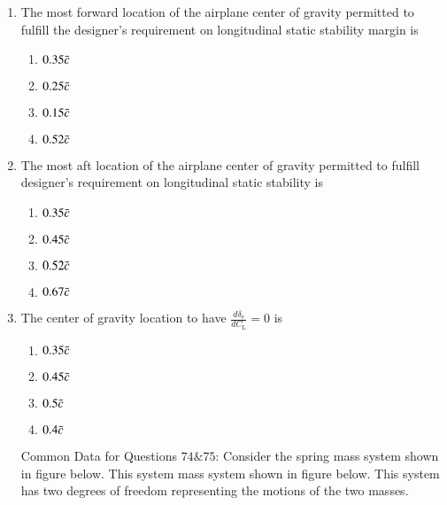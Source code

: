 \documentclass[journal]{IEEEtran}
\begin{document}
\begin{enumerate}
\item  The most forward location of the airplane  center of gravity permitted to fulfill the designer's requirement on longitudinal static stability margin is
\begin{enumerate}
    \item $0.35 \Bar{c}$
    \item $0.25 \Bar{c}$
    \item $0.15 \Bar{c}$
    \item $0.52 \Bar{c}$\\
\end{enumerate}
\item The most aft location of the airplane center of gravity permitted to fulfill designer's requirement on longitudinal static stability is
\begin{enumerate}
    \item $0.35 \Bar{c}$
    \item $0.45 \Bar{c}$
    \item $0.52 \Bar{c}$
    \item $0.67 \Bar{c}$\\
\end{enumerate}
\item The center of gravity location to have $\frac{d\delta_{\text{e}}}{dC_{\text{L}}} = 0$ is
\begin{enumerate}
    \item $0.35 \Bar{c}$
    \item $0.45 \Bar{c}$
    \item $0.5 \Bar{c}$
    \item $0.4 \Bar{c}$\\ 
\end{enumerate}
Common Data for Questions $74 \& 75$: Consider the spring mass system shown in figure below. This system mass system shown in figure below. This system has two degrees of freedom representing the motions of the two masses. 


\end{enumerate}
\end{document}
